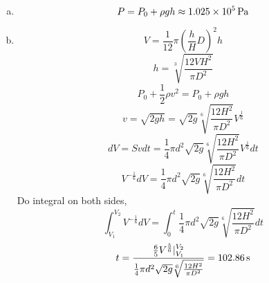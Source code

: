 \documentclass{article}
\begin{document}
\section{}
\begin{enumerate}[(a)]
\item
$$P=P_0+\rho gh\approx1.025\times10^5\,\rm{Pa}$$
\item
$$V=\frac{1}{12}\pi\left(\frac{h}{H}D\right)^2h$$
$$h=\sqrt[3]{\frac{12VH^2}{\pi D^2}}$$
$$P_0+\frac{1}{2}\rho v^2=P_0+\rho gh$$
$$v=\sqrt{2gh}=\sqrt{2g}\sqrt[6]{\frac{12H^2}{\pi D^2}}V^{\frac{1}{6}}$$
$$dV=Svdt=\frac{1}{4}\pi d^2\sqrt{2g}\sqrt[6]{\frac{12H^2}{\pi D^2}}V^{\frac{1}{6}}dt$$
$$V^{-\frac{1}{6}}dV=\frac{1}{4}\pi d^2\sqrt{2g}\sqrt[6]{\frac{12H^2}{\pi D^2}}dt$$
Do integral on both sides,
$$\int_{V_1}^{V_2}V^{-\frac{1}{6}}dV=\int_0^t\frac{1}{4}\pi d^2\sqrt{2g}\sqrt[6]{\frac{12H^2}{\pi D^2}}dt$$
$$t=\frac{\frac{6}{5}V^{\frac{5}{6}}|_{V_1}^{V_2}}{\frac{1}{4}\pi d^2\sqrt{2g}\sqrt[6]{\frac{12H^2}{\pi D^2}}}=102.86\,\rm{s}$$
\end{enumerate}
\end{document}
